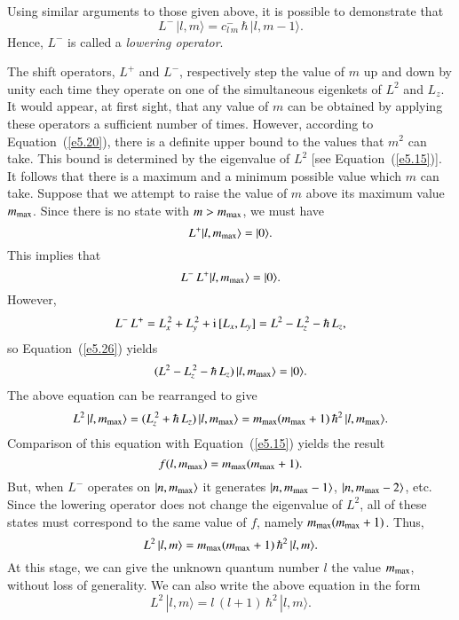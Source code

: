 Using similar arguments to those given above, it is possible
to demonstrate that
\begin{equation}\label{e5.24}
L^-\, |l ,m\rangle = c^-_{l\,m}\,\hbar\, |l, m-1\rangle.
\end{equation}
Hence, $L^-$ is called a {\em lowering operator}. 

The shift operators, $L^+$ and $L^-$, respectively step the value of $m$ up and down by unity
each time they operate on one of the simultaneous eigenkets of 
$L^2$ and $L_z$. It would appear, at first sight, that any value of
$m$ can be obtained by applying these operators a sufficient
number of times. However, according to Equation~(\ref{e5.20}), there is
a definite upper bound to the values that $m^2$ can take. This 
bound is determined by  the eigenvalue of $L^2$
[see Equation~(\ref{e5.15})]. It follows that there is a maximum and a minimum
possible
value which  $m$ can take. 
Suppose that we attempt to raise the value
of $m$ above its maximum value $m_{\rm max}$. Since there is  no
state with $m> m_{\rm max}$, we must have
\begin{equation}
L^+ |l, m_{\rm max}\rangle = |0\rangle.
\end{equation}
This implies that 
\begin{equation}\label{e5.26}
L^-\, L^+ |l, m_{\rm max}\rangle = |0\rangle.
\end{equation}
However,
\begin{equation}
L^-\, L^+ = L_x^{\,2} + L_y^{\,2} + {\rm i}\,[L_x,  L_y]
= L^2 - L_z^{\,2} - \hbar \,L_z,
\end{equation}
so Equation~(\ref{e5.26}) yields
\begin{equation}
(L^2 - L_z^{\,2} - \hbar \,L_z) \,|l, m_{\rm max}\rangle = |0\rangle.
\end{equation}
The above equation can be rearranged to give
\begin{equation}
L^2\, |l, m_{\rm max}\rangle = (L_z^{\,2} + \hbar \,L_z)\, |l, m_{\rm max}\rangle 
= m_{\rm max}(m_{\rm max} + 1) \,\hbar^2\, |l, m_{\rm max}\rangle.
\end{equation}
Comparison of this equation with Equation~(\ref{e5.15}) yields the result
\begin{equation}
f(l, m_{\rm max}) = m_{\rm max} (m_{\rm max} + 1).
\end{equation}
But, when $L^-$ operates on $|n, m_{\rm max}\rangle$ it generates
$|n, m_{\rm max}-1\rangle$, $|n, m_{\rm max}-2\rangle$,  etc. Since
the lowering operator does not change the eigenvalue of $L^2$, all of these states
must correspond to the same value of $f$, namely $m_{\rm max}(m_{\rm max} + 1)$.
Thus,
\begin{equation}
L^2 \,|l, m\rangle = m_{\rm max}(m_{\rm max} + 1)\,\hbar^2\, |l, m\rangle.
\end{equation}
At this stage, we can give the unknown quantum number $l$ the value $m_{\rm max}$,
without loss of generality. 
We can also write the above equation in the form
\begin{equation}
L^2 \,|l, m\rangle = l\,(l+1)\, \hbar^2\, |l, m\rangle.
\end{equation}

